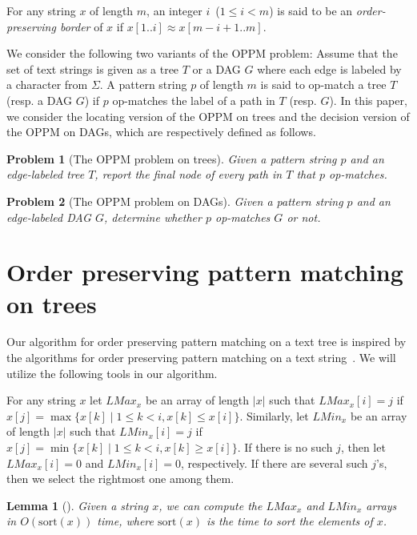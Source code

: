 \documentclass[a4paper,11pt]{article}
\newtheorem{lemma}{Lemma}
\newtheorem{problem}{Problem}
\newcommand{\Lmin}[1]{\mathit{LMin}_{#1}}
\newcommand{\Lmax}[1]{\mathit{LMax}_{#1}}
\newcommand{\sort}{\mathrm{sort}}
\begin{document}
For any string $x$ of length $m$,
an integer $i$~($1 \leq i < m$) is said to be
an \emph{order-preserving border} of $x$ if $x[1..i] \approx x[m-i+1..m]$.

We consider the following two variants of the OPPM problem:
Assume that the set of text strings is given
as a tree $T$ or a DAG $G$ where each edge is labeled by
a character from $\Sigma$.
A pattern string $p$ of length $m$ is said to op-match
a tree $T$ (resp. a DAG $G$) if $p$ op-matches the label of a path in $T$
(resp. $G$).
In this paper, we consider
the locating version of the OPPM on trees
and the decision version of the OPPM on DAGs,
which are respectively defined as follows.

\begin{problem}[The OPPM problem on trees] \label{prob:opmatch_tree}
  Given a pattern string $p$ and
  an edge-labeled tree $T$,
  report the final node of every path in $T$ that $p$ op-matches. 
\end{problem}

\begin{problem}[The OPPM problem on DAGs] \label{prob:opmatch_dag}
  Given a pattern string $p$ and
  an edge-labeled DAG $G$,
  determine whether $p$ op-matches $G$ or not.
\end{problem}



\section{Order preserving pattern matching on trees}

Our algorithm for order preserving pattern matching on
a text tree is inspired by the algorithms
for order preserving pattern matching on a text string~\cite{KubicaKRRW13,ChoNPS15}.
We will utilize the following tools in our algorithm.

For any string $x$ let $\Lmax{x}$ be an array of length $|x|$ such that
$\Lmax{x}[i] = j$ if $x[j] = \max\{x[k] \mid 1 \leq k < i, x[k] \leq x[i]\}$.
Similarly, let $\Lmin{x}$ be an array of length $|x|$ such that
$\Lmin{x}[i] = j$ if $x[j] = \min\{x[k] \mid 1 \leq k < i, x[k] \geq x[i]\}$.
If there is no such $j$, then let $\Lmax{x}[i] = 0$ and $\Lmin{x}[i] = 0$,
respectively.
If there are several such $j$'s,
then we select the rightmost one among them.

\begin{lemma}[\cite{KubicaKRRW13}] \label{lem:Lmin_Lmax_sort}
  Given a string $x$,
  we can compute the $\Lmax{x}$ and $\Lmin{x}$ arrays in $O(\sort(x))$ time,
  where $\sort(x)$ is the time to sort the elements of $x$.
\end{lemma}
\end{document}

